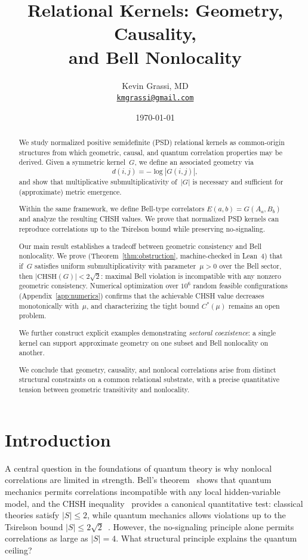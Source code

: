 \documentclass[11pt,a4paper]{article}
\title{Relational Kernels: Geometry, Causality,\\ and Bell Nonlocality}
\author{Kevin Grassi, MD\\[4pt] \normalsize \href{mailto:kmgrassi@gmail.com}{\texttt{kmgrassi@gmail.com}}}
\date{\today}
\theoremstyle{definition}
\theoremstyle{remark}
\newcommand{\CHSH}{\mathrm{CHSH}}
\begin{document}
\maketitle

\begin{abstract}
We study normalized positive semidefinite (PSD) relational kernels as common-origin structures from which geometric, causal, and quantum correlation properties may be derived. Given a symmetric kernel~$G$, we define an associated geometry via
\[
d(i,j) = -\log |G(i,j)|,
\]
and show that multiplicative submultiplicativity of~$|G|$ is necessary and sufficient for (approximate) metric emergence.

Within the same framework, we define Bell-type correlators $E(a,b) = G(A_a, B_b)$ and analyze the resulting CHSH values. We prove that normalized PSD kernels can reproduce correlations up to the Tsirelson bound while preserving no-signaling.

Our main result establishes a tradeoff between geometric consistency and Bell nonlocality. We prove (Theorem~\ref{thm:obstruction}, machine-checked in Lean~4) that if~$G$ satisfies uniform submultiplicativity with parameter~$\mu > 0$ over the Bell sector, then $|\CHSH(G)| < 2\sqrt{2}$: maximal Bell violation is incompatible with any nonzero geometric consistency. Numerical optimization over $10^6$ random feasible configurations (Appendix~\ref{app:numerics}) confirms that the achievable CHSH value decreases monotonically with~$\mu$, and characterizing the tight bound $C^*(\mu)$ remains an open problem.

We further construct explicit examples demonstrating \emph{sectoral coexistence}: a single kernel can support approximate geometry on one subset and Bell nonlocality on another.

We conclude that geometry, causality, and nonlocal correlations arise from distinct structural constraints on a common relational substrate, with a precise quantitative tension between geometric transitivity and nonlocality.
\end{abstract}

\section{Introduction}

A central question in the foundations of quantum theory is why nonlocal correlations are limited in strength. Bell's theorem~\cite{bell1964} shows that quantum mechanics permits correlations incompatible with any local hidden-variable model, and the CHSH inequality~\cite{chsh1969} provides a canonical quantitative test: classical theories satisfy $|S| \le 2$, while quantum mechanics allows violations up to the Tsirelson bound $|S| \le 2\sqrt{2}$~\cite{tsirelson1980,tsirelson1987}. However, the no-signaling principle alone permits correlations as large as $|S| = 4$. What structural principle explains the quantum ceiling?
\end{document}
